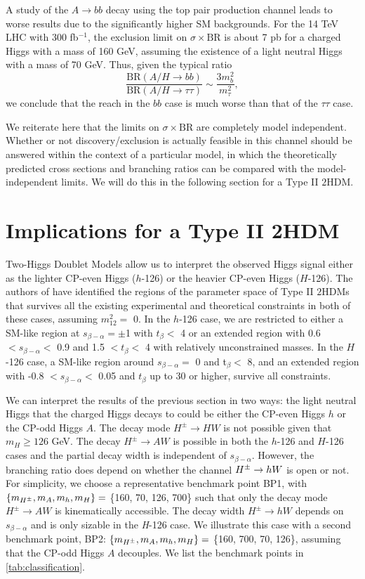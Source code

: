 A study of the $A \rightarrow bb$ decay using the top pair production channel leads to worse results due to the significantly higher SM backgrounds. For the 14 TeV LHC with 300 fb$^{-1}$, the exclusion limit on $\sigma \times \text{BR}$ is about 7 pb for a charged Higgs with a mass of 160 GeV, assuming the existence of a light neutral Higgs with a mass of 70 GeV. Thus, given the typical ratio 
\[\frac{\text{BR}(A/H \rightarrow bb)}{\text{BR}(A/H\rightarrow \tau\tau)} \sim \frac{3m^2_b}{m^2_{\tau}},\]
we conclude that the reach in the $bb$ case is much worse than that of the $\tau\tau$ case.

We reiterate here that the limits on $\sigma \times \text{BR}$ are completely model independent. Whether or not discovery/exclusion is actually feasible in this channel should be answered within the context of a particular model, in which the theoretically predicted cross sections and branching ratios can be compared with the model-independent limits. We will do this in the following section for a Type II $2$HDM. 

\section{Implications for a Type II 2HDM}\label{sec:implication}

Two-Higgs Doublet Models allow us to interpret the observed Higgs signal either as the lighter CP-even Higgs ($h$-126) or the heavier CP-even Higgs ($H$-126). The authors of \cite{Coleppa:2013dya} have identified the regions of the parameter space of Type II $2$HDMs that survives all the existing experimental and theoretical constraints in both of these cases, assuming $m_{12}^2=$ 0. In the $h$-126 case, we are restricted to either a SM-like region at $s_{\beta-\alpha}=\pm$1 with $t_{\beta}<$ 4 or an extended region with 0.6 $<s_{\beta-\alpha}<$ 0.9 and 1.5 $<t_{\beta}<$ 4 with relatively unconstrained masses. In the $H$-126 case, a SM-like region around $s_{\beta-\alpha}=$ 0 and t$_{\beta}<$ 8, and an extended region with -0.8 $< s_{\beta-\alpha}<$ 0.05 and $t_{\beta}$ up to 30 or higher, survive all constraints. 
 
We can interpret the results of the previous section in two ways: the light neutral Higgs that the charged Higgs decays to could be either the CP-even Higgs $h$ or the CP-odd Higgs $A$. The decay mode $H^{\pm} \rightarrow HW$ is not possible given that $m_{H}\geq 126$ GeV. The decay $H^{\pm} \rightarrow AW$ is possible in both the $h$-126 and $H$-126 cases and the partial decay width is independent of $s_{\beta-\alpha}$. However, the branching ratio does depend on whether the channel $H^{\pm} \rightarrow h W$ is open or not. For simplicity, we choose a representative benchmark point BP1, with $\left\{ {m_{H^{\pm}},m_{A},m_{h},m_{H}}\right\}=$ \{160, 70, 126, 700\} such that only the decay mode $H^{\pm} \rightarrow AW$ is kinematically accessible. The decay width $H^{\pm} \rightarrow h W$ depends on $s_{\beta-\alpha}$ and is only sizable in the \emph{H}-126 case. We illustrate this case with a second benchmark point, BP2: $\left\{ {m_{H^{\pm}},m_{A},m_{h},m_{H}}\right\}=$ \{160, 700, 70, 126\}, assuming that the CP-odd Higgs $A$ decouples. We list the benchmark points in \autoref{tab:classification}. 


